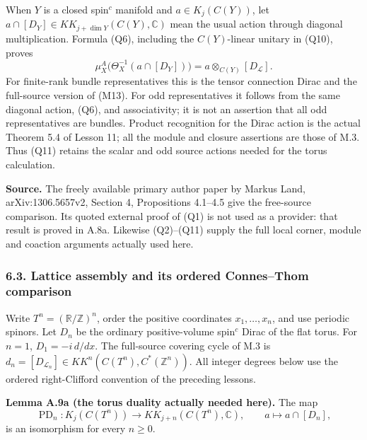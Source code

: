 \documentclass[
  11pt,
]{article}
\begin{document}
When \(Y\) is a closed spin\(^{c}\) manifold and \(a\in K_j(C(Y))\), let
\(a\cap[D_Y]\in KK_{j+\dim Y}(C(Y),\mathbb C)\) mean the usual action
through diagonal multiplication. Formula (Q6), including the
\(C(Y)\)-linear unitary in (Q10), proves \[
 \mu_X^A\bigl(\Theta_X^{-1}(a\cap[D_Y])\bigr)
                =a\otimes_{C(Y)}[D_{\mathcal L}].
 \tag{Q11}
\] For finite-rank bundle representatives this is the tensor connection
Dirac and the full-source version of (M13). For odd representatives it
follows from the same diagonal action, (Q6), and associativity; it is
not an assertion that all odd representatives are bundles. Product
recognition for the Dirac action is the actual Theorem 5.4 of Lesson 11;
all the module and closure assertions are those of M.3. Thus (Q11)
retains the scalar and odd source actions needed for the torus
calculation.

\textbf{Source.} The freely available primary author paper by Markus
Land, arXiv:1306.5657v2, Section 4, Propositions 4.1--4.5 give the
free-source comparison. Its quoted external proof of (Q1) is not used as
a provider: that result is proved in A.8a. Likewise (Q2)--(Q11) supply
the full local corner, module and coaction arguments actually used here.

\subsubsection{6.3. Lattice assembly and its ordered Connes--Thom
comparison}\label{lattice-assembly-and-its-ordered-connesthom-comparison}

Write \(T^n=(\mathbb R/\mathbb Z)^n\), order the positive coordinates
\(x_1,\ldots,x_n\), and use periodic spinors. Let \(D_n\) be the
ordinary positive-volume spin\(^{c}\) Dirac of the flat torus. For
\(n=1\), \(D_1=-i\,d/dx\). The full-source covering cycle of M.3 is
\(d_n=[D_{\mathcal L_n}]\in KK^n(C(T^n),C^*(\mathbb Z^n))\). All integer
degrees below use the ordered right-Clifford convention of the preceding
lessons.

\textbf{Lemma A.9a (the torus duality actually needed here).} The map \[
 \operatorname{PD}_n:K_j(C(T^n))\longrightarrow
 KK_{j+n}(C(T^n),\mathbb C),\qquad
 a\longmapsto a\cap[D_n],
 \tag{T1}
\] is an isomorphism for every \(n\geq0\).
\end{document}
